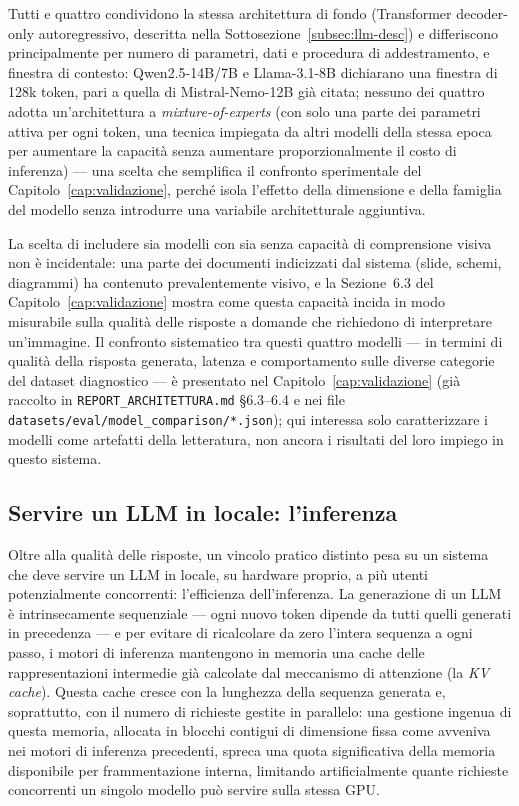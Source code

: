 Tutti e quattro condividono la stessa architettura di fondo (Transformer decoder-only autoregressivo, descritta nella
Sottosezione~\ref{subsec:llm-desc}) e differiscono principalmente per numero di parametri, dati e procedura di
addestramento, e finestra di contesto: Qwen2.5-14B/7B e Llama-3.1-8B
dichiarano una finestra di 128k token, pari a quella di Mistral-Nemo-12B già citata; nessuno dei quattro adotta
un'architettura a \emph{mixture-of-experts} (con solo una parte dei parametri attiva per ogni token, una tecnica
impiegata da altri modelli della stessa epoca per aumentare la capacità senza aumentare proporzionalmente il costo di
inferenza) --- una scelta che semplifica il confronto sperimentale del Capitolo~\ref{cap:validazione}, perché isola
l'effetto della dimensione e della famiglia del modello senza introdurre una variabile architetturale aggiuntiva.

La scelta di includere sia modelli con sia senza capacità di comprensione visiva non è incidentale: una parte dei
documenti indicizzati dal sistema (slide, schemi, diagrammi) ha contenuto prevalentemente visivo, e la Sezione~6.3 del
Capitolo~\ref{cap:validazione} mostra come questa capacità incida in modo misurabile sulla qualità delle risposte a
domande che richiedono di interpretare un'immagine. Il confronto sistematico tra questi quattro modelli --- in
termini di qualità della risposta generata, latenza e comportamento sulle diverse categorie del dataset diagnostico
--- è presentato nel Capitolo~\ref{cap:validazione} (già raccolto in \texttt{REPORT\_ARCHITETTURA.md} \S6.3--6.4 e nei
file \texttt{datasets/eval/model\_comparison/*.json}); qui interessa solo caratterizzare i modelli come artefatti
della letteratura, non ancora i risultati del loro impiego in questo sistema.

\subsection{Servire un LLM in locale: l'inferenza}
\label{sec:inferenza}

Oltre alla qualità delle risposte, un vincolo pratico distinto pesa su un sistema che deve servire un LLM in locale,
su hardware proprio, a più utenti potenzialmente concorrenti: l'efficienza dell'inferenza. La generazione di un LLM è
intrinsecamente sequenziale --- ogni nuovo token dipende da tutti quelli generati in precedenza --- e per evitare di
ricalcolare da zero l'intera sequenza a ogni passo, i motori di inferenza mantengono in memoria una cache delle
rappresentazioni intermedie già calcolate dal meccanismo di attenzione (la \emph{KV cache}). Questa cache cresce con
la lunghezza della sequenza generata e, soprattutto, con il numero di richieste gestite in parallelo: una gestione
ingenua di questa memoria, allocata in blocchi contigui di dimensione fissa come avveniva nei motori di inferenza
precedenti, spreca una quota significativa della memoria disponibile per frammentazione interna, limitando
artificialmente quante richieste concorrenti un singolo modello può servire sulla stessa GPU.

